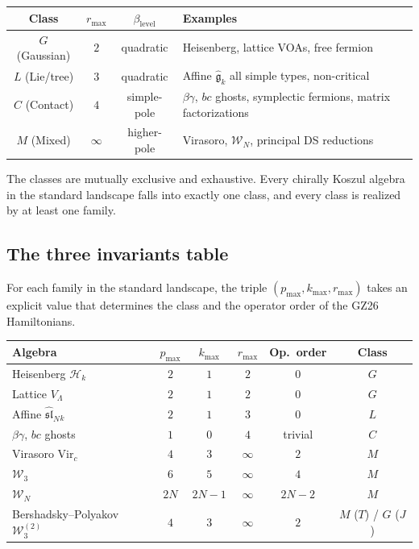 \documentclass[11pt]{article}
\theoremstyle{plain}
\theoremstyle{definition}
\theoremstyle{remark}
\newcommand{\fg}{\mathfrak{g}}
\newcommand{\fsl}{\mathfrak{sl}}
\newcommand{\cH}{\mathcal{H}}
\newcommand{\Walg}{\mathcal{W}}
\begin{document}
\begin{center}
\renewcommand{\arraystretch}{1.35}
\begin{tabular}{|c|c|c|l|}
\hline
\textbf{Class} & $r_{\max}$ & $\beta_{\mathrm{level}}$
 & \textbf{Examples} \\
\hline\hline
$G$ (Gaussian) & $2$ & quadratic
 & Heisenberg, lattice VOAs, free fermion \\
\hline
$L$ (Lie/tree) & $3$ & quadratic
 & Affine $\widehat{\fg}_k$ all simple types, non-critical \\
\hline
$C$ (Contact) & $4$ & simple-pole
 & $\beta\gamma$, $bc$ ghosts, symplectic fermions, matrix factorizations \\
\hline
$M$ (Mixed) & $\infty$ & higher-pole
 & Virasoro, $\Walg_N$, principal DS reductions \\
\hline
\end{tabular}
\end{center}

\noindent
The classes are mutually exclusive and exhaustive. Every
chirally Koszul algebra in the standard landscape falls into
exactly one class, and every class is realized by at least one
family.

\subsection{The three invariants table}

For each family in the standard landscape, the triple
$(p_{\max}, k_{\max}, r_{\max})$ takes an explicit value that
determines the class and the operator order of the GZ26
Hamiltonians.

\begin{center}
\renewcommand{\arraystretch}{1.35}
\begin{tabular}{|l|c|c|c|c|c|}
\hline
\textbf{Algebra} & $p_{\max}$ & $k_{\max}$ & $r_{\max}$
 & \textbf{Op.\ order} & \textbf{Class} \\
\hline\hline
Heisenberg $\cH_k$ & $2$ & $1$ & $2$ & $0$ & $G$ \\
\hline
Lattice $V_{\Lambda}$ & $2$ & $1$ & $2$ & $0$ & $G$ \\
\hline
Affine $\widehat{\fsl}_{N}{}_k$ & $2$ & $1$ & $3$ & $0$ & $L$ \\
\hline
$\beta\gamma$, $bc$ ghosts & $1$ & $0$ & $4$ & trivial & $C$ \\
\hline
Virasoro $\mathrm{Vir}_c$ & $4$ & $3$ & $\infty$ & $2$ & $M$ \\
\hline
$\Walg_3$ & $6$ & $5$ & $\infty$ & $4$ & $M$ \\
\hline
$\Walg_N$ & $2N$ & $2N-1$ & $\infty$ & $2N-2$ & $M$ \\
\hline
Bershadsky--Polyakov $\Walg^{(2)}_3$
 & $4$ & $3$ & $\infty$ & $2$
 & $M$ ($T$) / $G$ ($J$) \\
\hline
\end{tabular}
\end{center}
\end{document}
